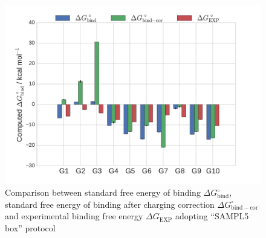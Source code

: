 \documentclass[11pt,oneside,a4paper]{article}
\begin{document}
\begin{figure}[h!]
\caption{Comparison between standard free energy of binding $\Delta G_\mathrm{bind}^\circ$, standard free energy of binding after charging correction $\Delta G_\mathrm{bind-cor}^\circ$ and experimental binding free energy $\Delta G_\mathrm{EXP}$ adopting ``SAMPL5 box'' protocol \label{fig:fig1}}
 \includegraphics[width=\textwidth]{figures/Fig1.pdf}
 \centering
\end{figure}
\end{document}

